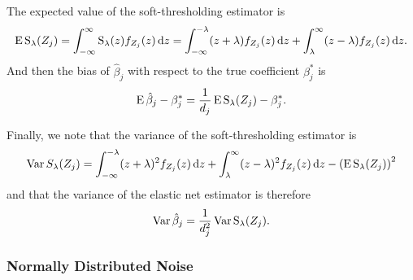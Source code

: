 The expected value of the soft-thresholding estimator is
\begin{equation*}
  \operatorname{E} \operatorname{S}_\lambda({Z_j}) = \int_{-\infty}^\infty \operatorname{S}_\lambda(z) f_{Z_j}(z) \mathop{}\!\mathrm{d} z
  = \int_{-\infty}^{-\lambda}(z + \lambda)f_{Z_j}(z) \mathop{}\!\mathrm{d} z + \int_{\lambda}^\infty (z - \lambda)f_{Z_j}(z) \mathop{}\!\mathrm{d} z.
\end{equation*}
And then the bias of \(\hat\beta_j\) with respect to the true coefficient \(\beta_j^*\) is
\begin{equation*}
  \operatorname{E} \hat\beta_j - \beta_j^* = \frac{1}{d_j}\operatorname{E} \operatorname{S}_\lambda({Z_j}) - \beta^*_j.
\end{equation*}

Finally, we note that the variance of the soft-thresholding estimator is
\begin{equation}
  \operatorname{Var} {S_\lambda({Z_j})} = \int_{-\infty}^{-\lambda}(z + \lambda)^2f_{Z_j}(z) \mathop{}\!\mathrm{d} z + \int_{\lambda}^\infty (z - \lambda)^2 f_{Z_j}(z) \mathop{}\!\mathrm{d} z - \left(\operatorname{E} \operatorname{S}_\lambda({Z_j})\right)^2
\end{equation}
and that the variance of the elastic net estimator is therefore
\begin{equation*}
  \operatorname{Var} \hat\beta_j = \frac{1}{d_j^2} \operatorname{Var} \operatorname{S}_\lambda({Z_j}).
\end{equation*}


\subsubsection{Normally Distributed Noise}%
\label{sec:normally-distributed-noise}

